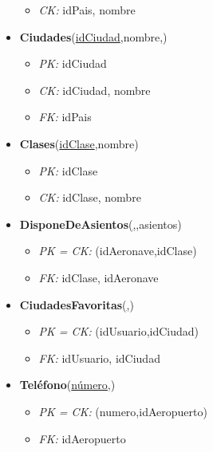 \begin{itemize}
\begin{itemize}
			\item \textit{CK: } idPais, nombre
		\end{itemize}
	\item \textbf{Ciudades}(\underline{idCiudad},nombre,)
		\begin{itemize}
			\item \textit{PK: } idCiudad
			\item \textit{CK: } idCiudad, nombre
			\item \textit{FK: } idPais
		\end{itemize}
	\item \textbf{Clases}(\underline{idClase},nombre)
		\begin{itemize}
			\item \textit{PK: } idClase
			\item \textit{CK: } idClase, nombre
		\end{itemize}
	\item \textbf{DisponeDeAsientos}(\underline{,},asientos)
		\begin{itemize}
			\item \textit{PK = CK: } (idAeronave,idClase)
			\item \textit{FK: } idClase, idAeronave	
		\end{itemize}
	\item \textbf{CiudadesFavoritas}(\underline{,})
		\begin{itemize}
			\item \textit{PK = CK: } (idUsuario,idCiudad)
			\item \textit{FK: } idUsuario, idCiudad	
		\end{itemize}
	\item \textbf{Tel\'efono}(\underline{n\'umero,})
		\begin{itemize}
			\item \textit{PK = CK: } (numero,idAeropuerto)
			\item \textit{FK: } idAeropuerto
		\end{itemize}
\end{itemize}	
